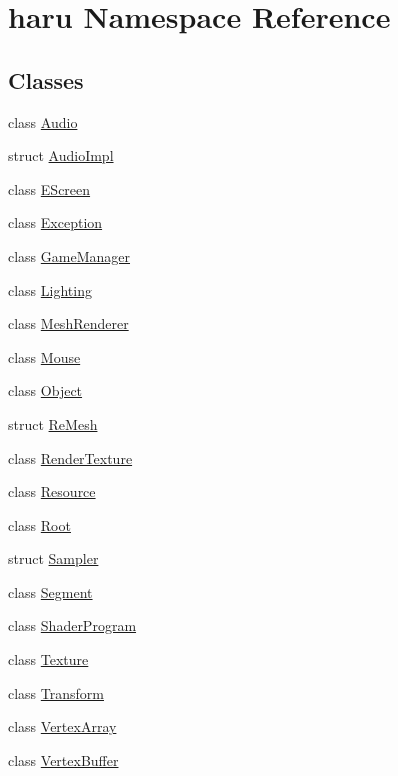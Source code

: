 \hypertarget{namespaceharu}{}\section{haru Namespace Reference}
\label{namespaceharu}
\subsection*{Classes}
\begin{DoxyCompactItemize}
\item 
class \mbox{\hyperlink{classharu_1_1_audio}{Audio}}
\item 
struct \mbox{\hyperlink{structharu_1_1_audio_impl}{Audio\+Impl}}
\item 
class \mbox{\hyperlink{classharu_1_1_e_screen}{E\+Screen}}
\item 
class \mbox{\hyperlink{classharu_1_1_exception}{Exception}}
\item 
class \mbox{\hyperlink{classharu_1_1_game_manager}{Game\+Manager}}
\item 
class \mbox{\hyperlink{classharu_1_1_lighting}{Lighting}}
\item 
class \mbox{\hyperlink{classharu_1_1_mesh_renderer}{Mesh\+Renderer}}
\item 
class \mbox{\hyperlink{classharu_1_1_mouse}{Mouse}}
\item 
class \mbox{\hyperlink{classharu_1_1_object}{Object}}
\item 
struct \mbox{\hyperlink{structharu_1_1_re_mesh}{Re\+Mesh}}
\item 
class \mbox{\hyperlink{classharu_1_1_render_texture}{Render\+Texture}}
\item 
class \mbox{\hyperlink{classharu_1_1_resource}{Resource}}
\item 
class \mbox{\hyperlink{classharu_1_1_root}{Root}}
\item 
struct \mbox{\hyperlink{structharu_1_1_sampler}{Sampler}}
\item 
class \mbox{\hyperlink{classharu_1_1_segment}{Segment}}
\item 
class \mbox{\hyperlink{classharu_1_1_shader_program}{Shader\+Program}}
\item 
class \mbox{\hyperlink{classharu_1_1_texture}{Texture}}
\item 
class \mbox{\hyperlink{classharu_1_1_transform}{Transform}}
\item 
class \mbox{\hyperlink{classharu_1_1_vertex_array}{Vertex\+Array}}
\item 
class \mbox{\hyperlink{classharu_1_1_vertex_buffer}{Vertex\+Buffer}}
\end{DoxyCompactItemize}
